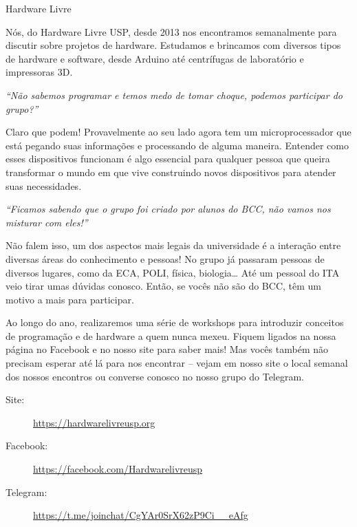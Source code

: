 \begin{subsecao}{Hardware Livre}


Nós, do Hardware Livre USP, desde 2013 nos encontramos semanalmente para
discutir sobre projetos de hardware. Estudamos e brincamos com diversos tipos de
hardware e software, desde Arduino até centrífugas de laboratório e impressoras
3D.

\textit{``Não sabemos programar e temos medo de tomar choque, podemos participar
do grupo?''}

Claro que podem! Provavelmente ao seu lado agora tem um microprocessador que
está pegando suas informações e processando de alguma maneira. Entender como
esses dispositivos funcionam é algo essencial para qualquer pessoa que queira
transformar o mundo em que vive construindo novos dispositivos para atender
suas necessidades.

\textit{``Ficamos sabendo que o grupo foi criado por alunos do BCC, não vamos
nos misturar com eles!''}

Não falem isso, um dos aspectos mais legais da universidade é a interação entre
diversas áreas do conhecimento e pessoas! No grupo já passaram pessoas de
diversos lugares, como da ECA, POLI, física, biologia… Até um pessoal do ITA
veio tirar umas dúvidas conosco. Então, se vocês não são do BCC, têm um motivo a
mais para participar.

Ao longo do ano, realizaremos uma série de workshops para introduzir conceitos 
de programação e de hardware a quem nunca mexeu. Fiquem ligados na nossa página 
no Facebook e no nosso site para saber mais! Mas vocês também não precisam 
esperar até lá para nos encontrar -- vejam em nosso site o local semanal dos 
nossos encontros ou converse conosco no nosso grupo do Telegram.

\begin{description}
  \item[Site:] \url{https://hardwarelivreusp.org}
  \item[Facebook:] \url{https://facebook.com/Hardwarelivreusp}
  \item[Telegram:] \url{https://t.me/joinchat/CgYAr0SrX62zP9Ci__eAfg}
\end{description}

\end{subsecao}
